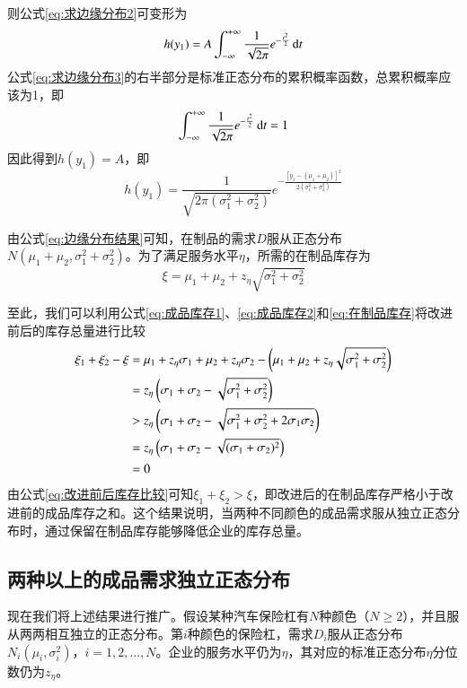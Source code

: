 则公式\ref{eq:求边缘分布2}可变形为
\begin{equation}
h(y_1) = A\int_{-\infty}^{+\infty}\frac{1}{\sqrt{2\pi}}e^{-\frac{t^2}{2}}\operatorname{d\!} t
\label{eq:求边缘分布3}
\end{equation}
公式\ref{eq:求边缘分布3}的右半部分是标准正态分布的累积概率函数，总累积概率应该为1，即
\[
\int_{-\infty}^{+\infty}\frac{1}{\sqrt{2\pi}}e^{-\frac{t^2}{2}}\operatorname{d\!} t = 1
\]
因此得到$h(y_1)=A$，即
\begin{equation}
h(y_1) = \frac{1}{\sqrt{2\pi(\sigma_1^2+\sigma_2^2)}}e^{-\frac{[y_1-(\mu_1+\mu_2)]^2}{2(\sigma_1^2+\sigma_2^2)}}
\label{eq:边缘分布结果}
\end{equation}

由公式\ref{eq:边缘分布结果}可知，在制品的需求$D$服从正态分布$N(\mu_1+\mu_2,\sigma_1^2+\sigma_2^2)$。为了满足服务水平$\eta$，所需的在制品库存为
\begin{equation}
\xi = \mu_1 + \mu_2 + z_\eta\sqrt{\sigma_1^2+\sigma_2^2}
\label{eq:在制品库存}
\end{equation}

至此，我们可以利用公式\ref{eq:成品库存1}、\ref{eq:成品库存2}和\ref{eq:在制品库存}将改进前后的库存总量进行比较
\begin{align}
\xi_1 + \xi_2 - \xi &= \mu_1 + z_\eta\sigma_1 + \mu_2 + z_\eta\sigma_2 - \left(\mu_1 + \mu_2 + z_\eta\sqrt{\sigma_1^2+\sigma_2^2}\right) \notag\\
&= z_\eta\left(\sigma_1+\sigma_2-\sqrt{\sigma_1^2+\sigma_2^2}\right) \notag\\
&> z_\eta\left(\sigma_1+\sigma_2-\sqrt{\sigma_1^2+\sigma_2^2+2\sigma_1\sigma_2}\right) \notag\\
&= z_\eta\left(\sigma_1+\sigma_2-\sqrt{(\sigma_1+\sigma_2)^2}\right) \notag\\
&= 0
\label{eq:改进前后库存比较}
\end{align}
由公式\ref{eq:改进前后库存比较}可知$\xi_1+\xi_2>\xi$，即改进后的在制品库存严格小于改进前的成品库存之和。这个结果说明，当两种不同颜色的成品需求服从独立正态分布时，通过保留在制品库存能够降低企业的库存总量。



\subsection{两种以上的成品需求独立正态分布}

现在我们将上述结果进行推广。假设某种汽车保险杠有$N$种颜色（$N\geq 2$），并且服从两两相互独立的正态分布。第$i$种颜色的保险杠，需求$D_i$服从正态分布$N_i(\mu_i,\sigma_i^2)$，$i=1,2,\ldots,N$。企业的服务水平仍为$\eta$，其对应的标准正态分布$\eta$分位数仍为$z_\eta$。

